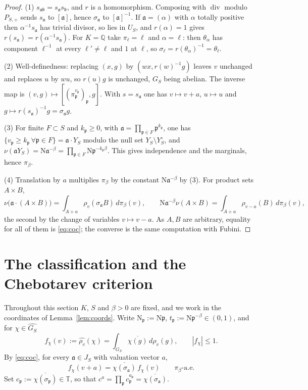 \documentclass[11pt]{amsart}
\numberwithin{equation}{section}
\theoremstyle{definition}
\theoremstyle{remark}
\newcommand{\Q}{\mathbb{Q}}
\newcommand{\T}{\mathbb{T}}
\newcommand{\Ns}{\mathrm{N}}
\newcommand{\pp}{\mathfrak{p}}
\newcommand{\aaa}{\mathfrak{a}}
\newcommand{\bb}{\mathfrak{b}}
\begin{document}
\begin{proof}
(1) $s_{\aaa\bb}=s_\aaa s_\bb$, and $r$ is a homomorphism. Composing with
$\operatorname{div}$ modulo $P_{S,+}$ sends $s_\aaa$ to $[\aaa]$, hence $\sigma_\aaa$ to
$[\aaa]^{-1}$. If $\aaa=(\alpha)$ with $\alpha$ totally positive then $\alpha^{-1}s_\aaa$ has
trivial divisor, so lies in $U_S$, and $r(\alpha)=1$ gives
$r(s_\aaa)=r(\alpha^{-1}s_\aaa)$. For $K=\Q$ take $\pi_\ell=\ell$ and $\alpha=\ell$: then
$\theta_\alpha$ has component $\ell^{-1}$ at every $\ell'\neq\ell$ and $1$ at $\ell$, so
$\sigma_\ell=r(\theta_\alpha)^{-1}=\theta_\ell$.

(2) Well-definedness: replacing $(x,g)$ by $(wx,r(w)^{-1}g)$ leaves $v$
unchanged and replaces $u$ by $wu$, so $r(u)g$ is unchanged, $G_S$ being
abelian. The inverse map is $(v,g)\mapsto[(\pi_\pp^{v_\pp})_\pp,g]$. With
$s=s_\aaa$ one has $v\mapsto v+a$, $u\mapsto u$ and
$g\mapsto r(s_\aaa)^{-1}g=\sigma_\aaa g$.

(3) For finite $F\subset S$ and $k_\pp\ge0$, with $\aaa=\prod_{\pp\in F}\pp^{k_\pp}$,
one has $\{v_\pp\ge k_\pp\,\forall\pp\in F\}=\aaa\cdot Y_S$ modulo the null set
$Y_S\setminus Y_S^\circ$, and $\nu(\aaa Y_S)=\Ns\aaa^{-\beta}=\prod_{\pp\in F}\Ns\pp^{-k_\pp\beta}$.
This gives independence and the marginals, hence $\pi_\beta$.

(4) Translation by $a$ multiplies $\pi_\beta$ by the constant $\Ns\aaa^{-\beta}$
by (3). For product sets $A\times B$,
\[
\nu\bigl(\aaa\cdot(A\times B)\bigr)=\int_{A+a}\rho_v(\sigma_\aaa B)\,d\pi_\beta(v),
\qquad
\Ns\aaa^{-\beta}\nu(A\times B)=\int_{A+a}\rho_{v-a}(B)\,d\pi_\beta(v),
\]
the second by the change of variables $v\mapsto v-a$. As $A,B$ are arbitrary,
equality for all of them is \eqref{eq:coc}; the converse is the same
computation with Fubini.
\end{proof}
\section{The classification and the Chebotarev criterion}\label{sec:crit}

Throughout this section $K$, $S$ and $\beta>0$ are fixed, and we work in the
coordinates of Lemma~\ref{lem:coords}. Write $\Ns_\pp:=\Ns\pp$,
$t_\pp:=\Ns\pp^{-\beta}\in(0,1)$, and for $\chi\in\widehat{G_S}$
\[
f_\chi(v):=\widehat{\rho_v}(\chi)=\int_{G_S}\overline{\chi(g)}\,d\rho_v(g),\qquad|f_\chi|\le1 .
\]
By \eqref{eq:coc}, for every $\aaa\in J_S$ with valuation vector $a$,
\begin{equation}\label{eq:fchi}
f_\chi(v+a)=\overline{\chi(\sigma_\aaa)}\,f_\chi(v)\qquad\pi_\beta\text{-a.e.}
\end{equation}
Set $c_\pp:=\overline{\chi(\sigma_\pp)}\in\T$, so that $c^a=\prod_\pp c_\pp^{a_\pp}=\overline{\chi(\sigma_\aaa)}$.
\end{document}
